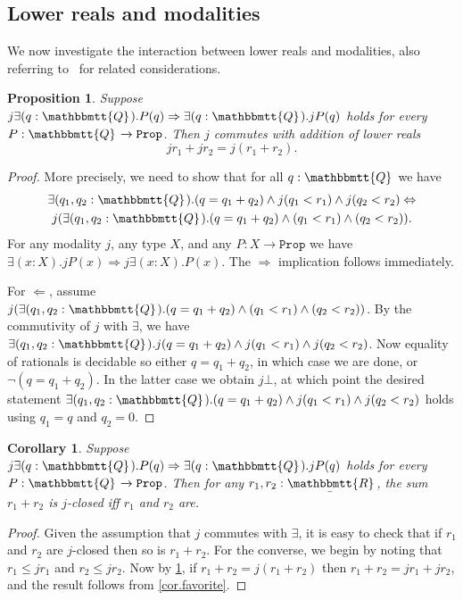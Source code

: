 \documentclass[reqno,11pt]{amsproc}
\theoremstyle{plain}
\newtheorem{proposition}[theorem]{Proposition}
\newtheorem{corollary}[theorem]{Corollary}
\theoremstyle{definition}
\newcommand{\Const}[1]{\mathtt{#1}}
\renewcommand{\to}[1][]{\xrightarrow{#1}}
\newcommand{\ubar}[1]{\underaccent{\bar}{#1}}
\newcommand{\internal}[1]{\raisebox{-.03ex}{$\mathbbmtt{#1}$}}
\newcommand{\hs}{\hspace{1pt}}
\newcommand{\tqq}{\internal{Q}\hs}
\newcommand{\trr}{\internal{R}}
\newcommand{\tlrr}{\ubar{\trr}\hs}
\newcommand{\prop}{\Const{Prop}}
\newcommand{\imp}{\Rightarrow}
\renewcommand{\iff}{\Leftrightarrow}
\numberwithin{equation}{section}
\begin{document}
\subsection{Lower reals and modalities}

We now investigate the interaction between lower reals and modalities, also referring to~\cite{schultz2019temporal} for related considerations.

\begin{proposition}\label{prop.commute_exists_commute_addition}
Suppose $j\exists(q:\tqq).P(q)\imp \exists(q:\tqq).jP(q)$ holds for every $P:\tqq\to\prop$. Then $j$ commutes with addition of lower reals
\[
	jr_1+jr_2=j(r_1+r_2).
\]
\end{proposition}
\begin{proof}
More precisely, we need to show that for all $q:\tqq$ we have
\begin{multline*}
	\exists(q_1,q_2:\tqq).(q=q_1+q_2)\wedge j(q_1<r_1)\wedge j(q_2<r_2)\iff\\
	j(\exists(q_1,q_2:\tqq).(q=q_1+q_2)\wedge (q_1<r_1)\wedge(q_2<r_2)).
\end{multline*}
For any modality $j$, any type $X$, and any $P:X\to\prop$ we have $\exists(x:X).jP(x)\imp j\exists(x:X).P(x)$. The $\imp$ implication follows immediately.

For $\Leftarrow$, assume $j(\exists(q_1,q_2:\tqq).(q=q_1+q_2)\wedge (q_1<r_1)\wedge(q_2<r_2))$. By the commutivity of $j$ with $\exists$, we have $\exists(q_1,q_2:\tqq).j(q=q_1+q_2)\wedge j(q_1<r_1)\wedge j(q_2<r_2)$. Now equality of rationals is decidable so either $q=q_1+q_2$, in which case we are done, or $\neg(q=q_1+q_2)$. In the latter case we obtain $j\bot$, at which point the desired statement $\exists(q_1,q_2:\tqq).(q=q_1+q_2)\wedge j(q_1<r_1)\wedge j(q_2<r_2)$ holds using $q_1=q$ and $q_2=0$.
\end{proof}

\begin{corollary}\label{cor.closed_sum}
Suppose $j\exists(q:\tqq).P(q)\imp \exists(q:\tqq).jP(q)$ holds for every $P:\tqq\to\prop$. Then for any $r_1,r_2:\tlrr$, the sum $r_1+r_2$ is $j$-closed iff $r_1$ and $r_2$ are.
\end{corollary}
\begin{proof}
Given the assumption that $j$ commutes with $\exists$, it is easy to check that if $r_1$ and $r_2$ are $j$-closed then so is $r_1+r_2$. For the converse, we begin by noting that $r_1\leq jr_1$ and $r_2\leq jr_2$. Now by \cref{prop.commute_exists_commute_addition}, if $r_1+r_2=j(r_1+r_2)$ then $r_1+r_2=jr_1+jr_2$, and the result follows from \cref{cor.favorite}.
\end{proof}
\end{document}
